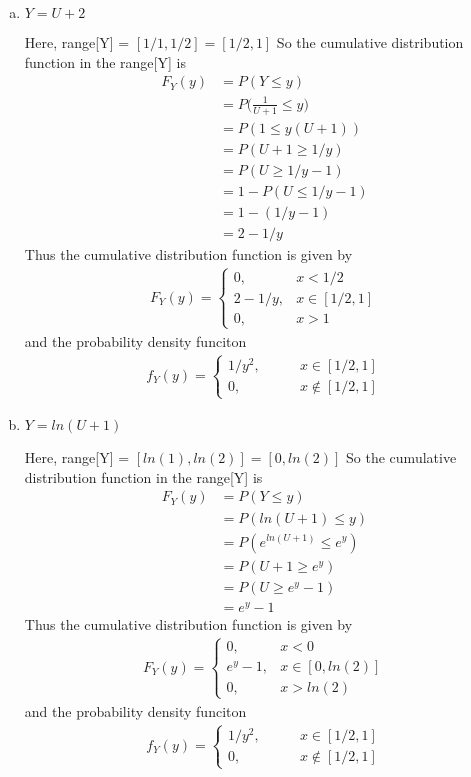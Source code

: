 \documentclass[11pt, oneside]{article}   	%
\begin{document}
\begin{enumerate}[(a)]
	\item $Y=U+2$
		
	Here, range[Y] = $[1/1, 1/2] = [1/2, 1]$ So the cumulative distribution function in the range[Y] is
	\begin{align*}
		F_Y(y) & = P(Y \leq y) \\
		& = P\Big(\frac{1}{U+1} \leq y\Big) \\
		& = P(1 \leq y(U+1)) \\
		& = P(U+1 \geq 1/y) \\
		& = P(U \geq 1/y -1) \\
		& = 1 - P(U \leq 1/y-1) \\
		& = 1 - (1/y-1) \\
		& = 2 - 1/y
	\end{align*}
	Thus the cumulative distribution function is given by
	\begin{align*}
		F_Y(y) = \begin{cases}
					0, \qquad & x < 1/2 \\
					2-1/y, & x \in [1/2, 1]\\
					0, &  x >1
				\end{cases}
	\end{align*}
	and the probability density funciton
	\begin{align*}
		f_Y(y) = \begin{cases}
					1/y^2, \qquad & x \in [1/2, 1] \\
					0, & x \notin [1/2, 1]
				\end{cases}
	\end{align*}
	
	\item $Y=ln(U+1)$
		
	Here, range[Y] = $[ln(1), ln(2)] = [0, ln(2)]$ So the cumulative distribution function in the range[Y] is
	\begin{align*}
		F_Y(y) & = P(Y \leq y) \\
		& = P(ln(U+1) \leq y) \\
		& = P(e^{ln(U+1)} \leq e^y) \\
		& = P(U+1 \geq e^y) \\
		& = P(U \geq e^y-1) \\
		& = e^y-1
	\end{align*}
	Thus the cumulative distribution function is given by
	\begin{align*}
		F_Y(y) = \begin{cases}
					0, \qquad & x < 0 \\
					e^y-1, & x \in [0, ln(2)]\\
					0, &  x >ln(2)
				\end{cases}
	\end{align*}
	and the probability density funciton
	\begin{align*}
		f_Y(y) = \begin{cases}
					1/y^2, \qquad & x \in [1/2, 1] \\
					0, & x \notin [1/2, 1]
				\end{cases}
	\end{align*}
\end{enumerate}
\end{document}
